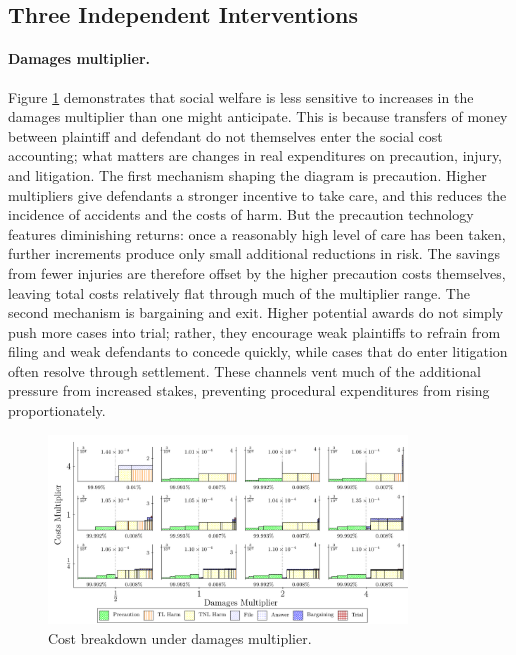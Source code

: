\documentclass{article}
\begin{document}
\subsection{Three Independent Interventions}

\FloatBarrier
\paragraph{Damages multiplier.}  
Figure \ref{fig:damages_multiplier} demonstrates that social welfare is less sensitive to increases in the damages multiplier than one might anticipate. This is because transfers of money between plaintiff and defendant do not themselves enter the social cost accounting; what matters are changes in real expenditures on precaution, injury, and litigation. The first mechanism shaping the diagram is precaution. Higher multipliers give defendants a stronger incentive to take care, and this reduces the incidence of accidents and the costs of harm. But the precaution technology features diminishing returns: once a reasonably high level of care has been taken, further increments produce only small additional reductions in risk. The savings from fewer injuries are therefore offset by the higher precaution costs themselves, leaving total costs relatively flat through much of the multiplier range. The second mechanism is bargaining and exit. Higher potential awards do not simply push more cases into trial; rather, they encourage weak plaintiffs to refrain from filing and weak defendants to concede quickly, while cases that do enter litigation often resolve through settlement. These channels vent much of the additional pressure from increased stakes, preventing procedural expenditures from rising proportionately.  

\begin{figure}[ht]
  \centering
  \includegraphics[width=0.85\textwidth]{../Figures/Cost Breakdown Damages Multiplier (All Rows).pdf}
  \caption{Cost breakdown under damages multiplier.}
  \label{fig:damages_multiplier}
\end{figure}
\end{document}
